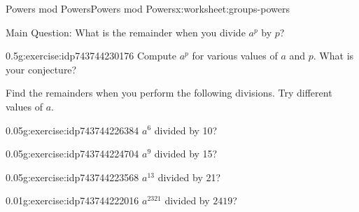 \documentclass[11pt]{book}
\begin{document}
%
%
\typeout{************************************************}
\typeout{************************************************}
%
\begin{worksheet-subsection}{Powers mod Powers}{}{Powers mod Powers}{}{}{x:worksheet:groups-powers}
\begin{introduction}{}%
Main Question: What is the remainder when you divide \(a^p\) by \(p\)?%
\end{introduction}%
\begin{divisionexercise}{1}{}{0.5}{g:exercise:idp743744230176}%
Compute \(a^p\) for various values of \(a\) and \(p\).  What is your conjecture?%
\end{divisionexercise}%
Find the remainders when you perform the following divisions.  Try different values of \(a\).%
\begin{divisionexercise}{2}{}{0.05}{g:exercise:idp743744226384}%
\(a^6\) divided by 10?%
\end{divisionexercise}%
\begin{divisionexercise}{3}{}{0.05}{g:exercise:idp743744224704}%
\(a^9\) divided by 15?%
\end{divisionexercise}%
\begin{divisionexercise}{4}{}{0.05}{g:exercise:idp743744223568}%
\(a^{13}\) divided by 21?%
\end{divisionexercise}%
\begin{divisionexercise}{5}{}{0.01}{g:exercise:idp743744222016}%
\(a^{2321}\) divided by \(2419\)?%
\end{divisionexercise}%
\end{worksheet-subsection}
\restoregeometry
\end{document}
